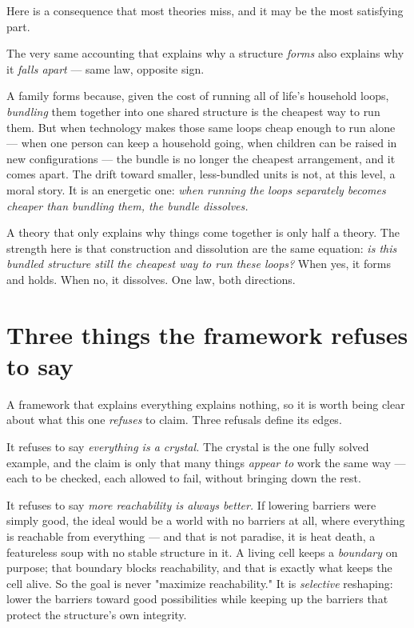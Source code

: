 \documentclass{article}
\begin{document}
Here is a consequence that most theories miss, and it may be the most satisfying part.

The very same accounting that explains why a structure \textit{forms} also explains why it \textit{falls apart} --- same law, opposite sign.

A family forms because, given the cost of running all of life's household loops, \textit{bundling} them together into one shared structure is the cheapest way to run them. But when technology makes those same loops cheap enough to run alone --- when one person can keep a household going, when children can be raised in new configurations --- the bundle is no longer the cheapest arrangement, and it comes apart. The drift toward smaller, less-bundled units is not, at this level, a moral story. It is an energetic one: \textit{when running the loops separately becomes cheaper than bundling them, the bundle dissolves.}

A theory that only explains why things come together is only half a theory. The strength here is that construction and dissolution are the same equation: \textit{is this bundled structure still the cheapest way to run these loops?} When yes, it forms and holds. When no, it dissolves. One law, both directions.

\section{Three things the framework refuses to say}

A framework that explains everything explains nothing, so it is worth being clear about what this one \textit{refuses} to claim. Three refusals define its edges.

It refuses to say \textit{everything is a crystal.} The crystal is the one fully solved example, and the claim is only that many things \textit{appear to} work the same way --- each to be checked, each allowed to fail, without bringing down the rest.

It refuses to say \textit{more reachability is always better.} If lowering barriers were simply good, the ideal would be a world with no barriers at all, where everything is reachable from everything --- and that is not paradise, it is heat death, a featureless soup with no stable structure in it. A living cell keeps a \textit{boundary} on purpose; that boundary blocks reachability, and that is exactly what keeps the cell alive. So the goal is never "maximize reachability." It is \textit{selective} reshaping: lower the barriers toward good possibilities while keeping up the barriers that protect the structure's own integrity.
\end{document}
